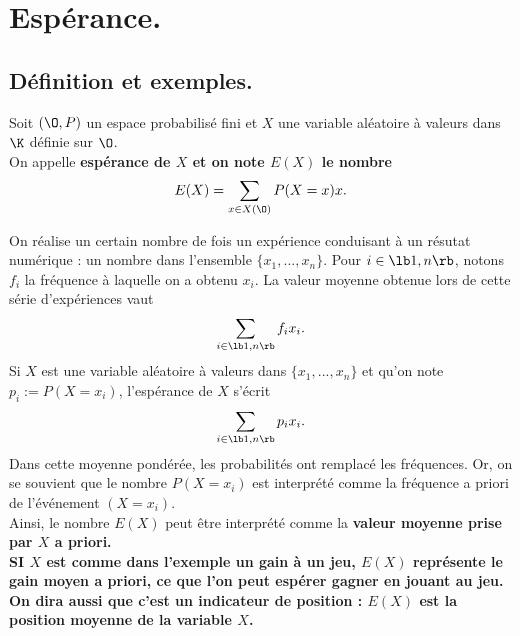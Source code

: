\documentclass[11pt]{article}
\begin{document}



\section{Espérance.}
\subsection{Définition et exemples.}

\begin{defi}{}{}
    Soit $(\O, P)$ un espace probabilisé fini et $X$ une variable aléatoire à valeurs dans $\K$ définie sur $\O$.\\
    On appelle \bf{espérance} de $X$ et on note $E(X)$ le nombre
    \begin{equation*}
        E(X)=\sum_{x\in X(\O)}P(X=x)x.
    \end{equation*}
\end{defi}

\begin{inter}{}{}
    On réalise un certain nombre de fois un expérience conduisant à un résutat numérique : un nombre dans l'ensemble $\{x_1,...,x_n\}$. Pour $i\in\lb1,n\rb$, notons $f_i$ la fréquence à laquelle on a obtenu $x_i$. La valeur moyenne obtenue lors de cette série d'expériences vaut
    \begin{equation*}
        \sum_{i\in\lb1,n\rb}f_ix_i.
    \end{equation*}
    Si $X$ est une variable aléatoire à valeurs dans $\{x_1,...,x_n\}$ et qu'on note $p_i:=P(X=x_i)$, l'espérance de $X$ s'écrit
    \begin{equation*}
        \sum_{i\in\lb1,n\rb}p_ix_i.
    \end{equation*}
    Dans cette moyenne pondérée, les probabilités ont remplacé les fréquences. Or, on se souvient que le nombre $P(X=x_i)$ est interprété comme la fréquence a priori de l'événement $(X=x_i)$.\\
    Ainsi, le nombre $E(X)$ peut être interprété comme la \bf{valeur moyenne} prise par $X$ a priori.\\
    SI $X$ est comme dans l'exemple un gain à un jeu, $E(X)$ représente le gain moyen a priori, ce que l'on peut espérer gagner en jouant au jeu. On dira aussi que c'est un indicateur de position : $E(X)$ est la position moyenne de la variable $X$.
\end{inter}
\end{document}
